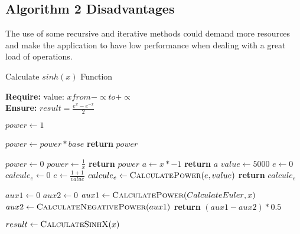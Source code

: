\documentclass[12pt]{report}
\begin{document}
\subsection{Algorithm 2 Disadvantages}
The use of some recursive and iterative methods could demand more resources and make the application to have low performance when dealing with a great load of operations. 
\begin{algorithm}

\caption{Calculate $sinh(x)$ Function}

\textbf{Require:}  value: $x from -\propto to + \propto$  \\
\textbf{Ensure:} $result = \frac{e^x- e^{-x}}{2}$
\begin{algorithmic}[1]

    \State $power \leftarrow 1$
    
    \State $power \leftarrow power * base$
    \EndFor
    \State \textbf{return} $power$
    \EndProcedure
\Statex

    \State $power \leftarrow 0$
    \State $power \leftarrow \frac{1}{x}$
    \State \textbf{return} $power$
    \EndProcedure
\Statex
{}
    \State $a \leftarrow x*-1$
    \State \textbf{return} $a$
    \EndProcedure
\Statex
{}
    \State $value \leftarrow 5000$
    \State $e \leftarrow 0$
    \State $calcule_e \leftarrow 0$
    \State $e \leftarrow \frac{1+1}{value}$
    \State $calcule_e \leftarrow \Call{CalculatePower}{e,value} $
    \State \textbf{return} $calcule_e$
    \EndProcedure
\Statex

    \State $aux1 \leftarrow 0$ 
    \State $aux2 \leftarrow 0$ 
   \State $aux1 \leftarrow \Call{CalculatePower}{CalculateEuler{ },x} $
   \State $aux2 \leftarrow \Call{CalculateNegativePower}{aux1} $
    \State \textbf{return} $(aux1-aux2)*0.5${}
    \EndProcedure
\Statex


\State $ result \leftarrow \Call{CalculateSinhX}{x}$

\end{algorithmic}
\end{algorithm}
\end{document}
